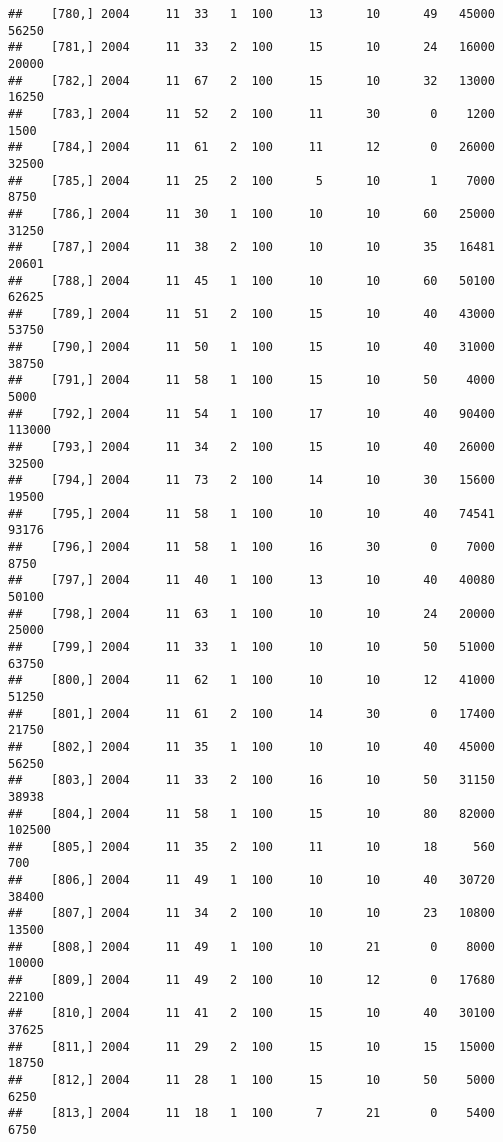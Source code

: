 \documentclass{article}\usepackage[]{graphicx}\usepackage[]{color}
\makeatletter
\newenvironment{kframe}{%
 \def\at@end@of@kframe{}%
 \ifinner\ifhmode%
  \def\at@end@of@kframe{\end{minipage}}%
  \begin{minipage}{\columnwidth}%
 \fi\fi%
 \def\FrameCommand##1{\hskip\@totalleftmargin \hskip-\fboxsep
 \colorbox{shadecolor}{##1}\hskip-\fboxsep
     \hskip-\linewidth \hskip-\@totalleftmargin \hskip\columnwidth}%
 \MakeFramed {\advance\hsize-\width
   \@totalleftmargin\z@ \linewidth\hsize
   \@setminipage}}%
 {\par\unskip\endMakeFramed%
 \at@end@of@kframe}
\newenvironment{knitrout}{}{} %
\makeatother
\begin{document}
\begin{knitrout}
\begin{kframe}
\begin{verbatim}
##    [780,] 2004     11  33   1  100     13      10      49   45000   56250
##    [781,] 2004     11  33   2  100     15      10      24   16000   20000
##    [782,] 2004     11  67   2  100     15      10      32   13000   16250
##    [783,] 2004     11  52   2  100     11      30       0    1200    1500
##    [784,] 2004     11  61   2  100     11      12       0   26000   32500
##    [785,] 2004     11  25   2  100      5      10       1    7000    8750
##    [786,] 2004     11  30   1  100     10      10      60   25000   31250
##    [787,] 2004     11  38   2  100     10      10      35   16481   20601
##    [788,] 2004     11  45   1  100     10      10      60   50100   62625
##    [789,] 2004     11  51   2  100     15      10      40   43000   53750
##    [790,] 2004     11  50   1  100     15      10      40   31000   38750
##    [791,] 2004     11  58   1  100     15      10      50    4000    5000
##    [792,] 2004     11  54   1  100     17      10      40   90400  113000
##    [793,] 2004     11  34   2  100     15      10      40   26000   32500
##    [794,] 2004     11  73   2  100     14      10      30   15600   19500
##    [795,] 2004     11  58   1  100     10      10      40   74541   93176
##    [796,] 2004     11  58   1  100     16      30       0    7000    8750
##    [797,] 2004     11  40   1  100     13      10      40   40080   50100
##    [798,] 2004     11  63   1  100     10      10      24   20000   25000
##    [799,] 2004     11  33   1  100     10      10      50   51000   63750
##    [800,] 2004     11  62   1  100     10      10      12   41000   51250
##    [801,] 2004     11  61   2  100     14      30       0   17400   21750
##    [802,] 2004     11  35   1  100     10      10      40   45000   56250
##    [803,] 2004     11  33   2  100     16      10      50   31150   38938
##    [804,] 2004     11  58   1  100     15      10      80   82000  102500
##    [805,] 2004     11  35   2  100     11      10      18     560     700
##    [806,] 2004     11  49   1  100     10      10      40   30720   38400
##    [807,] 2004     11  34   2  100     10      10      23   10800   13500
##    [808,] 2004     11  49   1  100     10      21       0    8000   10000
##    [809,] 2004     11  49   2  100     10      12       0   17680   22100
##    [810,] 2004     11  41   2  100     15      10      40   30100   37625
##    [811,] 2004     11  29   2  100     15      10      15   15000   18750
##    [812,] 2004     11  28   1  100     15      10      50    5000    6250
##    [813,] 2004     11  18   1  100      7      21       0    5400    6750

\end{verbatim}
\end{kframe}
\end{knitrout}
\end{document}
